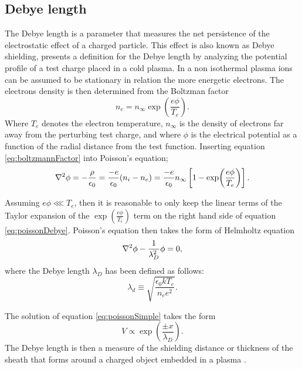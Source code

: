 \subsection{Debye length}
The Debye length is a parameter that measures the net persistence of the electrostatic effect of a charged particle. This effect is also known as Debye shielding, \parencite[Section 3.1.2]{HutchinsonIanH2002Popd} presents a definition for the Debye length by analyzing the potential profile of a test charge placed in a cold plasma. In a non isothermal plasma ions can be assumed to be stationary in relation the more energetic electrons. The electrons density is then determined from the Boltzman factor
\begin{equation}\label{eq:boltzmannFactor}
    n_e = n_{\infty} \exp(\frac{e \phi}{T_e}).
\end{equation}
Where $T_e$ denotes the electron temperature, $n_{\infty}$ is the density of electrons far away from the perturbing test charge, and where $\phi$ is the electrical potential as a function of the radial distance from the test function. Inserting equation \eqref{eq:boltzmannFactor} into Poisson's equation;
\begin{equation}\label{eq:poissonDebye}
    \laplacian{\phi}  = - \frac{\rho}{\epsilon_0} = \frac{-e}{\epsilon_0} (n_i - n_e) = \frac{-e}{\epsilon_0} n_{\infty} \left[1 - \exp (\frac{e \phi}{T_e}) \right].
\end{equation}

Assuming $e \phi \lll T_e$, then it is reasonable to only keep the linear terms of the Taylor expansion of the $\exp (\frac{e \phi}{T_e})$ term on the right hand side of equation \eqref{eq:poissonDebye}. Poisson's equation then takes the form of Helmholtz equation
\begin{equation}\label{eq:poissonSimple}
    \laplacian{\phi} - \frac{1}{\lambda_D^2} \phi = 0,
\end{equation}
where the Debye length $\lambda_D$ has been defined as follows:
\begin{equation}\label{eq:debyelength}
    \lambda_d \equiv \sqrt{\frac{\epsilon_0 k T_e}{n_e e^2}}.
\end{equation}

The solution of equation \eqref{eq:poissonSimple} takes the form
\begin{equation*}
    V \propto \exp (\frac{\pm x}{\lambda_D}).
\end{equation*}
The Debye length is then a measure of the shielding distance or thickness of the sheath that forms around a charged object embedded in a plasma \parencite[Section 1.4]{Chen2018}.


